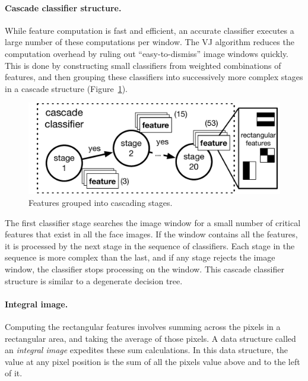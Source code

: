 \paragraph{Cascade classifier structure.} While feature computation is fast and efficient, an accurate classifier executes a large number of these computations per window. The VJ algorithm reduces the  computation overhead by ruling out ``easy-to-dismiss'' image windows quickly. This is done by constructing small classifiers from weighted combinations of features, and then grouping these classifiers into successively more complex stages in a cascade structure (Figure~\ref{fig:vj-cascade}).

\begin{figure}[h]
\centering
    \begin{center}
\includegraphics[width=.5\textwidth]{nsp-figs/cascade_structure.pdf}
    \end{center}
    \caption{Features grouped into cascading stages. }
    \label{fig:vj-cascade}
\end{figure}

The first classifier stage searches the image window for a small number of critical features that exist in all the face images. If the window contains all the features, it is processed by the next stage in the sequence of classifiers. Each stage in the sequence is more complex than the last, and if any stage rejects the image window, the classifier stops processing on the window. This cascade classifier structure is similar to a degenerate decision tree.

\paragraph{Integral image.}Computing the rectangular features involves summing across
the pixels in a rectangular area, and taking the average of those pixels.
A data structure called an \emph{integral image} expedites these sum calculations. In this
data structure, the value at any pixel position is the sum of all the pixels value above and
to the left of it.

